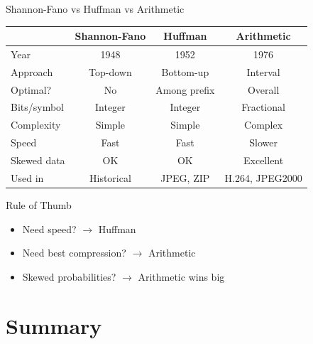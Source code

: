 \documentclass[aspectratio=169,12pt]{beamer}
\begin{document}
\begin{frame}{Shannon-Fano vs Huffman vs Arithmetic}
    \begin{center}
        \begin{tabular}{l|c|c|c}
            \toprule
            & \textbf{Shannon-Fano} & \textbf{Huffman} & \textbf{Arithmetic} \\
            \midrule
            Year & 1948 & 1952 & 1976 \\
            Approach & Top-down & Bottom-up & Interval \\
            Optimal? & No & Among prefix & Overall \\
            Bits/symbol & Integer & Integer & Fractional \\
            Complexity & Simple & Simple & Complex \\
            Speed & Fast & Fast & Slower \\
            Skewed data & OK & OK & Excellent \\
            Used in & Historical & JPEG, ZIP & H.264, JPEG2000 \\
            \bottomrule
        \end{tabular}
    \end{center}
    
    \vspace{0.3cm}
    \begin{block}{Rule of Thumb}
        \begin{itemize}
            \item Need speed? $\rightarrow$ Huffman
            \item Need best compression? $\rightarrow$ Arithmetic
            \item Skewed probabilities? $\rightarrow$ Arithmetic wins big
        \end{itemize}
    \end{block}
\end{frame}

\section{Summary}
\end{document}
